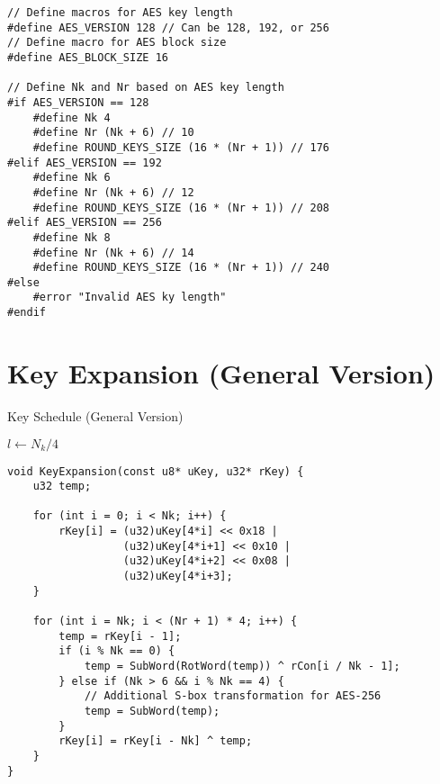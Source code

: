 \begin{lstlisting}[style=C, caption={Configuration},captionpos=t]
// Define macros for AES key length
#define AES_VERSION 128 // Can be 128, 192, or 256
// Define macro for AES block size
#define AES_BLOCK_SIZE 16

// Define Nk and Nr based on AES key length
#if AES_VERSION == 128
	#define Nk 4
	#define Nr (Nk + 6) // 10
	#define ROUND_KEYS_SIZE (16 * (Nr + 1)) // 176
#elif AES_VERSION == 192
	#define Nk 6
	#define Nr (Nk + 6) // 12
	#define ROUND_KEYS_SIZE (16 * (Nr + 1)) // 208
#elif AES_VERSION == 256
	#define Nk 8
	#define Nr (Nk + 6) // 14
	#define ROUND_KEYS_SIZE (16 * (Nr + 1)) // 240
#else
	#error "Invalid AES ky length"
#endif
\end{lstlisting}


\newpage
\section{Key Expansion (General Version)}
\begin{algorithm}[H]
	\caption{Key Schedule (General Version)}
	
	\BlankLine
	$l\gets N_k/4$
\end{algorithm}
\begin{lstlisting}[style=C, caption={Key Expansion (General ver.)},captionpos=t]
void KeyExpansion(const u8* uKey, u32* rKey) {
	u32 temp;
	
	for (int i = 0; i < Nk; i++) {
		rKey[i] = (u32)uKey[4*i] << 0x18 | 
				  (u32)uKey[4*i+1] << 0x10 | 
				  (u32)uKey[4*i+2] << 0x08 | 
				  (u32)uKey[4*i+3];
	}
	
	for (int i = Nk; i < (Nr + 1) * 4; i++) {
		temp = rKey[i - 1];
		if (i % Nk == 0) {
			temp = SubWord(RotWord(temp)) ^ rCon[i / Nk - 1];
		} else if (Nk > 6 && i % Nk == 4) {
			// Additional S-box transformation for AES-256
			temp = SubWord(temp);
		}
		rKey[i] = rKey[i - Nk] ^ temp;
	}
}
\end{lstlisting}

